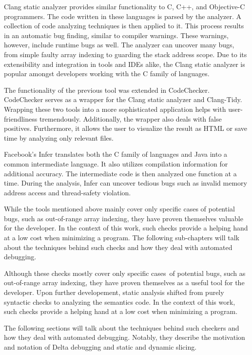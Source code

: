 Clang static analyzer provides similar functionality to C, C++, and 
Objective-C programmers.
The code written in these languages is parsed by the analyzer.
A collection of code analyzing techniques is then applied to it.
This process results in an automatic bug finding, similar to compiler 
warnings.
These warnings, however, include runtime bugs as well.
The analyzer can uncover many bugs, from simple faulty array 
indexing to guarding the stack address scope.
Due to its extensibility and integration in tools and IDEs alike, 
the Clang static analyzer is popular amongst developers working 
with the C family of languages.

The functionality of the previous tool was extended in CodeChecker.
CodeChecker serves as a wrapper for the Clang static analyzer and 
Clang-Tidy.
Wrapping these two tools into a more sophisticated application helps 
with user-friendliness tremendously.
Additionally, the wrapper also deals with false positives.
Furthermore, it allows the user to visualize the result as HTML or 
save time by analyzing only relevant files.

Facebook's Infer translates both the C family of languages and Java 
into a common intermediate language.
It also utilizes compilation information for additional accuracy.
The intermediate code is then analyzed one function at a time.
During the analysis, Infer can uncover tedious bugs such as invalid 
memory address access and thread-safety violation.

While the tools mentioned above mainly cover only specific cases 
of potential bugs, such as out-of-range array indexing, they 
have proven themselves valuable for the developer.
In the context of this work, such checks provide a helping hand 
at a low cost when minimizing a program.
The following sub-chapters will talk about the techniques behind 
such checks and how they deal with automated debugging.

Although these checks mostly cover only specific 
cases~of potential bugs, such as out-of-range array indexing, they have proven 
themselves as a useful tool for the developer.
Upon further developement, static analysis shifted from purely syntactic
checks to analyzing the semantics code.
In the context of this work, such checks provide a helping hand 
at a low cost when minimizing a program. 

The following sections will talk about the techniques behind such checkers 
and how they deal with automated debugging. Notably, they describe
the motivation and notation of Delta debugging and static and dynamic
slicing.

